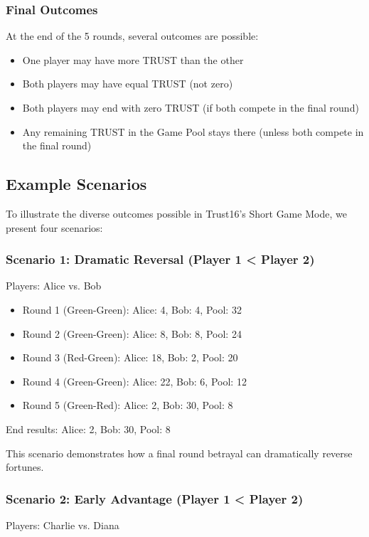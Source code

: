 \documentclass[12pt,a4paper]{article}
\begin{document}
\subsubsection{Final Outcomes}
At the end of the 5 rounds, several outcomes are possible:
\begin{itemize}
    \item One player may have more TRUST than the other
    \item Both players may have equal TRUST (not zero)
    \item Both players may end with zero TRUST (if both compete in the final round)
    \item Any remaining TRUST in the Game Pool stays there (unless both compete in the final round)
\end{itemize}

\subsection{Example Scenarios}
To illustrate the diverse outcomes possible in Trust16's Short Game Mode, we present four scenarios:

\subsubsection{Scenario 1: Dramatic Reversal (Player 1 < Player 2)}
Players: Alice vs. Bob

\begin{itemize}
    \item Round 1 (Green-Green): Alice: 4, Bob: 4, Pool: 32
    \item Round 2 (Green-Green): Alice: 8, Bob: 8, Pool: 24
    \item Round 3 (Red-Green): Alice: 18, Bob: 2, Pool: 20
    \item Round 4 (Green-Green): Alice: 22, Bob: 6, Pool: 12
    \item Round 5 (Green-Red): Alice: 2, Bob: 30, Pool: 8
\end{itemize}

End results: Alice: 2, Bob: 30, Pool: 8

This scenario demonstrates how a final round betrayal can dramatically reverse fortunes.

\subsubsection{Scenario 2: Early Advantage (Player 1 < Player 2)}
Players: Charlie vs. Diana
\end{document}

